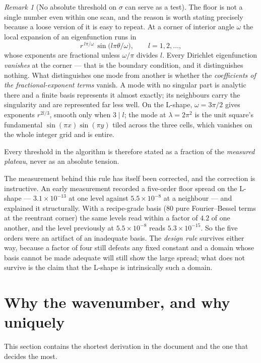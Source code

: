 \documentclass[11pt]{article}
\theoremstyle{definition}
\theoremstyle{remark}
\newtheorem{remark}{Remark}
\newcommand{\lam}{\lambda}
\newcommand{\sig}{\sigma}
\begin{document}
\begin{remark}[No absolute threshold on $\sig$ can serve as a test]
\label{rem:nothreshold}
The floor is not a single number even within one scan, and the reason is worth stating
precisely because a loose version of it is easy to repeat. At a corner of interior angle
$\omega$ the local expansion of an eigenfunction runs in
\[
  r^{\,l\pi/\omega}\,\sin\!\bigl(l\pi\theta/\omega\bigr), \qquad l = 1,2,\dots,
\]
whose exponents are fractional unless $\omega/\pi$ divides $l$. Every Dirichlet eigenfunction
\emph{vanishes} at the corner --- that is the boundary condition, and it distinguishes
nothing. What distinguishes one mode from another is whether the \emph{coefficients of the
fractional-exponent terms} vanish. A mode with no singular part is analytic there and a finite
basis represents it almost exactly; its neighbours carry the singularity and are represented
far less well. On the L-shape, $\omega=3\pi/2$ gives exponents $r^{2l/3}$, smooth only when
$3\mid l$; the mode at $\lam=2\pi^2$ is the unit square's fundamental
$\sin(\pi x)\sin(\pi y)$ tiled across the three cells, which vanishes on the whole integer
grid and is entire.

Every threshold in the algorithm is therefore stated as a fraction of the \emph{measured
plateau}, never as an absolute tension.

The measurement behind this rule has itself been corrected, and the correction is instructive.
An early measurement recorded a five-order floor spread on the L-shape --- $3.1\times10^{-13}$
at one level against $5.5\times10^{-8}$ at a neighbour --- and explained it structurally. With
a recipe-grade basis (80 pure Fourier--Bessel terms at the reentrant corner) the same levels
read within a factor of $4.2$ of one another, and the level previously at $5.5\times10^{-8}$
reads $5.3\times10^{-15}$. So the five orders were an artifact of an inadequate basis. The
\emph{design rule} survives either way, because a factor of four still defeats any fixed
constant and a domain whose basis cannot be made adequate will still show the large spread;
what does not survive is the claim that the L-shape is intrinsically such a domain.
\end{remark}

\section{Why the wavenumber, and why uniquely}
\label{sec:whyk}

This section contains the shortest derivation in the document and the one that decides the
most.
\end{document}
